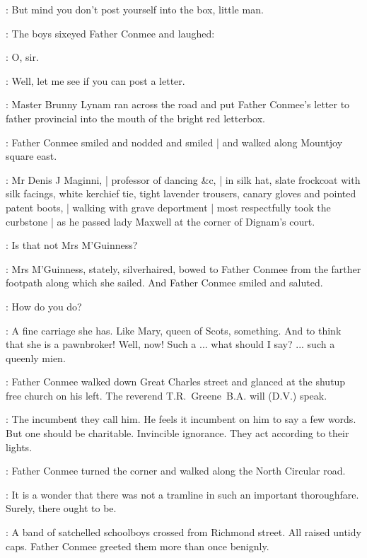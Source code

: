 \conmee:
But mind you don't post yourself into the box, little man.

:
The boys sixeyed Father Conmee and laughed:

\Boys:
O, sir.

\conmee:
Well, let me see if you can post a letter.

:
Master Brunny Lynam ran across the road
and put Father Conmee's letter to father provincial
into the mouth of the bright red letterbox.

:
Father Conmee smiled and nodded and smiled |
and walked along Mountjoy square east.

\begin{mdframed}
    :
    Mr Denis J Maginni, |
    professor of dancing \&c, |
    in silk hat,
    slate frockcoat with silk facings,
    white kerchief tie,
    tight lavender trousers,
    canary gloves
    and pointed patent boots, |
    walking with grave deportment |
    most respectfully took the curbstone |
    as he passed lady Maxwell
    at the corner of Dignam's court.
\end{mdframed}

\conmeeint:
Is that not Mrs M'Guinness?

:
Mrs M'Guinness,
stately, silverhaired,
bowed to Father Conmee from the farther footpath
along which she sailed.
And Father Conmee smiled and saluted.

\conmee:
How do you do?

\conmeeint:
A fine carriage she has.
Like Mary, queen of Scots, something.
And to think that she is a pawnbroker!
Well, now!
Such a ...
what should I say? ...
such a queenly mien.

:
Father Conmee walked down Great Charles street
and glanced at the shutup free church on his left.
The reverend T.R.~Greene~B.A. will (D.V.) speak.

\conmeeint:
The incumbent they call him.
He feels it incumbent on him to say a few words.
But one should be charitable.
Invincible ignorance.
They act according to their lights.

:
Father Conmee turned the corner
and walked along the North Circular road.

\conmeeint:
It is a wonder that there was not a tramline
in such an important thoroughfare.
Surely, there ought to be.

:
A band of satchelled schoolboys crossed from Richmond street.
All raised untidy caps.
Father Conmee greeted them more than once benignly.

